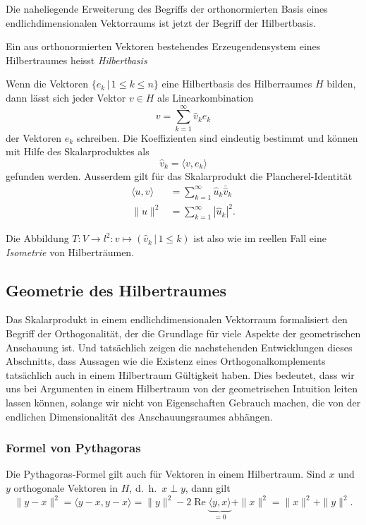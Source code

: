 Die naheliegende Erweiterung des Begriffs der orthonormierten Basis
eines endlichdimensionalen Vektorraums ist jetzt der Begriff der
Hilbertbasis.

\begin{definition}
Ein aus orthonormierten Vektoren bestehendes Erzeugendensystem
eines Hilbertraumes heisst {\em Hilbertbasis}
\end{definition}
%

\begin{satz}
Wenn die Vektoren $\{e_k\,|\, 1\le k\le n\}$ eine Hilbertbasis des
Hilberraumes $H$ bilden,
dann lässt sich jeder Vektor $v\in H$ als Linearkombination
\[
v
=
\sum_{k=1}^\infty \hat{v}_k e_k
\]
der Vektoren $e_k$ schreiben.
Die Koeffizienten sind eindeutig bestimmt und können mit Hilfe des
Skalarproduktes als
\[
\hat{v}_k = \langle v,e_k\rangle
\]
gefunden werden.
Ausserdem gilt für das Skalarprodukt die Plancherel-Identität
%
\begin{align*}
\langle u,v\rangle &= \sum_{k=1}^\infty \hat{u}_k\bar{\hat{v}}_k
\\
\| u \|^2 &= \sum_{k=1}^\infty |\hat{u}_k|^2.
\end{align*}
\end{satz}

Die Abbildung $T\colon V\to l^2: v\mapsto (\hat{v}_k\,|\,1\le k)$
ist also wie im reellen Fall eine {\em Isometrie} von Hilberträumen.
%

\subsection{Geometrie des Hilbertraumes
\label{subsection:geometrie-hilbertraum}}
Das Skalarprodukt in einem endlichdimensionalen Vektorraum formalisiert
den Begriff der Orthogonalität, der die Grundlage für viele Aspekte
der geometrischen Anschauung ist.
Und tatsächlich zeigen die nachstehenden Entwicklungen dieses Abschnitts,
dass Aussagen wie die Existenz eines Orthogonalkomplements tatsächlich
auch in einem Hilbertraum Gültigkeit haben.
Dies bedeutet, dass wir uns bei Argumenten in einem Hilbertraum von 
der geometrischen Intuition leiten lassen können, solange wir nicht
von Eigenschaften Gebrauch machen, die von der endlichen Dimensionalität
des Anschauungsraumes abhängen.

\subsubsection{Formel von Pythagoras}
%
Die Pythagoras-Formel gilt auch für Vektoren in einem Hilbertraum.
Sind $x$ und $y$ orthogonale Vektoren in $H$, d.~h.~$x\perp y$, dann
gilt
\begin{equation}
\|y-x\|^2
=
\langle y-x,y-x\rangle
=
\|y\|^2
-
2\operatorname{Re}\underbrace{\langle y,x\rangle}_{\displaystyle=0}
+
\|x\|^2
=
\|x\|^2 + \|y\|^2.
\label{formel:pythagoras}
\end{equation}

